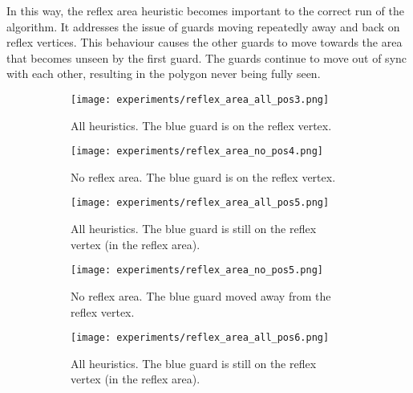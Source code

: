 In this way, the reflex area heuristic becomes important to the correct run of the algorithm. It addresses the issue of guards moving repeatedly away and back on reflex vertices. This behaviour causes the other guards to move towards the area that becomes unseen by the first guard. The guards continue to move out of sync with each other, resulting in the polygon never being fully seen.

\newpage
\begin{figure}[h!]
    \centering
    \begin{adjustbox}{minipage=\textwidth,scale=0.9}
        \begin{subfigure}{0.45\textwidth}
            \texttt{[image: experiments/reflex\_area\_all\_pos3.png]}
            \caption{All heuristics. The blue guard is on the reflex vertex.}
            \label{fig:reflex_area_all1}
        \end{subfigure}
        \hfill
        \begin{subfigure}{0.45\textwidth}
            \texttt{[image: experiments/reflex\_area\_no\_pos4.png]}
            \caption{No reflex area. The blue guard is on the reflex vertex.}
            \label{fig:reflex_area_no1}
        \end{subfigure}
        \begin{subfigure}{0.45\textwidth}
            \texttt{[image: experiments/reflex\_area\_all\_pos5.png]}
            \caption{All heuristics. The blue guard is still on the reflex vertex (in the reflex area).}
        \end{subfigure}
        \hfill
        \begin{subfigure}{0.45\textwidth}
            \texttt{[image: experiments/reflex\_area\_no\_pos5.png]}
            \caption{No reflex area. The blue guard moved away from the reflex vertex.}
            \label{fig:reflex_area_no2}
        \end{subfigure}
        \begin{subfigure}{0.45\textwidth}
            \texttt{[image: experiments/reflex\_area\_all\_pos6.png]}
            \caption{All heuristics. The blue guard is still on the reflex vertex (in the reflex area).}
            \label{fig:reflex_area_all4}
        \end{subfigure}
        \hfill
        \begin{subfigure}{0.45\textwidth}

\end{subfigure}
\end{adjustbox}
\end{figure}
